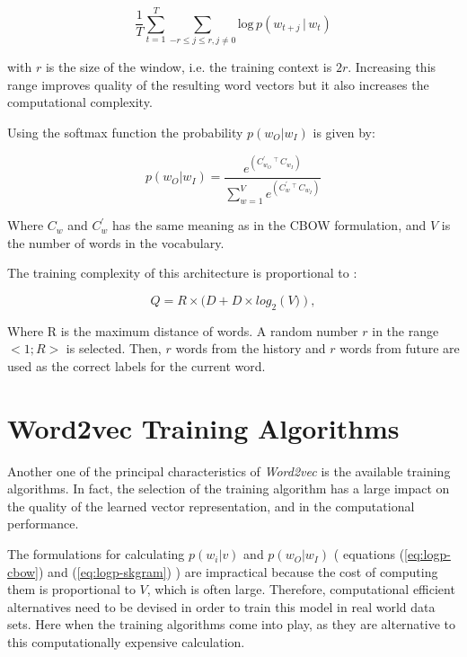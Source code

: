  \begin{equation}
  \label{eq:sumprob-cbow}
   \frac{1}{T} \sum^{T}_{t=1}{\sum_{-r \leq j \leq r, j \neq 0}\text{log} \, p
     \left( w_{t+j} \, |\, w_t  \right)}
\end{equation}

with $r$ is the size of the window, i.e. the training context is $2r$.
Increasing this range improves quality of the resulting word vectors but it
also increases the computational complexity.

Using the softmax function the probability  $p(w_O|w_I)$ is given by:

\begin{equation}
  \label{eq:logp-skgram}
  p(w_O|w_I) = \frac{e^{\left(C^{'}_{w_O}\,^\top\,C_{w_I} \right)}
  }{\sum^{V}_{w=1} e^{\left( C^{'}_w \,^\top\, C_{w_I} \right) } }  
\end{equation}


Where $C_w$ and $C^{'}_w$  has the same meaning as in the \ac{CBOW}
formulation,  and $V$ is the number of words in the vocabulary.

The training complexity of this architecture is proportional to
\cite{DBLP:journals/corr/abs-1301-3781}:

\begin{equation}
  Q = R \times (D + D \times log_2 \left(V)\right),  
\end{equation}

Where R is the maximum distance of words. A random number $r$ in the range $<
1; R >$ is selected. Then, $r$ words from the history and $r$ words from future are used as the correct labels for the current word.
 

\section{Word2vec Training Algorithms}
\label{sec:word2v-tran-algorithms}
Another one of the principal  characteristics of  \textit{Word2vec} is the
available training algorithms. In
fact, the selection of the training algorithm has a large  impact on
 the quality of the learned vector representation,  and in the
computational performance.

The formulations for calculating $p(w_i|v)$ and  $p(w_O|w_I)$  ( equations
(\ref{eq:logp-cbow})  and  (\ref{eq:logp-skgram}) ) are impractical because
the cost of computing them is proportional to $V$, which is often large.
Therefore, computational efficient alternatives need to be devised in order to
train this model in real world data sets. Here when the training algorithms
come into play, as they are alternative to this computationally expensive
calculation. 

